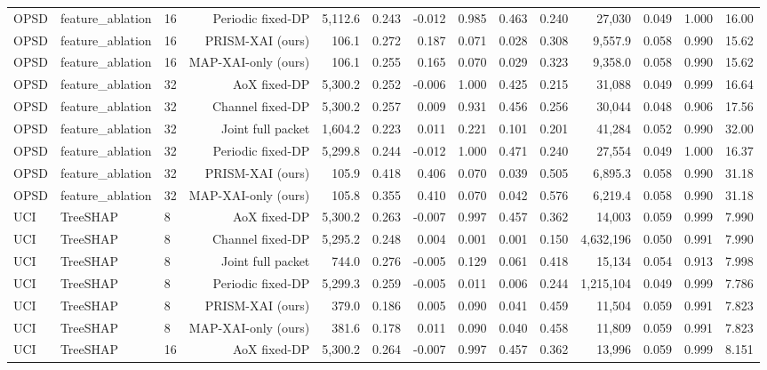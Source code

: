 \begin{longtable}{lllrrrrrrrrrrr}
OPSD & feature\_ablation & 16 & Periodic fixed-DP & 5,112.6 & 0.243 & -0.012 & 0.985 & 0.463 & 0.240 & 27,030 & 0.049 & 1.000 & 16.00 \\
OPSD & feature\_ablation & 16 & PRISM-XAI (ours) & 106.1 & 0.272 & 0.187 & 0.071 & 0.028 & 0.308 & 9,557.9 & 0.058 & 0.990 & 15.62 \\
OPSD & feature\_ablation & 16 & MAP-XAI-only (ours) & 106.1 & 0.255 & 0.165 & 0.070 & 0.029 & 0.323 & 9,358.0 & 0.058 & 0.990 & 15.62 \\
OPSD & feature\_ablation & 32 & AoX fixed-DP & 5,300.2 & 0.252 & -0.006 & 1.000 & 0.425 & 0.215 & 31,088 & 0.049 & 0.999 & 16.64 \\
OPSD & feature\_ablation & 32 & Channel fixed-DP & 5,300.2 & 0.257 & 0.009 & 0.931 & 0.456 & 0.256 & 30,044 & 0.048 & 0.906 & 17.56 \\
OPSD & feature\_ablation & 32 & Joint full packet & 1,604.2 & 0.223 & 0.011 & 0.221 & 0.101 & 0.201 & 41,284 & 0.052 & 0.990 & 32.00 \\
OPSD & feature\_ablation & 32 & Periodic fixed-DP & 5,299.8 & 0.244 & -0.012 & 1.000 & 0.471 & 0.240 & 27,554 & 0.049 & 1.000 & 16.37 \\
OPSD & feature\_ablation & 32 & PRISM-XAI (ours) & 105.9 & 0.418 & 0.406 & 0.070 & 0.039 & 0.505 & 6,895.3 & 0.058 & 0.990 & 31.18 \\
OPSD & feature\_ablation & 32 & MAP-XAI-only (ours) & 105.8 & 0.355 & 0.410 & 0.070 & 0.042 & 0.576 & 6,219.4 & 0.058 & 0.990 & 31.18 \\
UCI & TreeSHAP & 8 & AoX fixed-DP & 5,300.2 & 0.263 & -0.007 & 0.997 & 0.457 & 0.362 & 14,003 & 0.059 & 0.999 & 7.990 \\
UCI & TreeSHAP & 8 & Channel fixed-DP & 5,295.2 & 0.248 & 0.004 & 0.001 & 0.001 & 0.150 & 4,632,196 & 0.050 & 0.991 & 7.990 \\
UCI & TreeSHAP & 8 & Joint full packet & 744.0 & 0.276 & -0.005 & 0.129 & 0.061 & 0.418 & 15,134 & 0.054 & 0.913 & 7.998 \\
UCI & TreeSHAP & 8 & Periodic fixed-DP & 5,299.3 & 0.259 & -0.005 & 0.011 & 0.006 & 0.244 & 1,215,104 & 0.049 & 0.999 & 7.786 \\
UCI & TreeSHAP & 8 & PRISM-XAI (ours) & 379.0 & 0.186 & 0.005 & 0.090 & 0.041 & 0.459 & 11,504 & 0.059 & 0.991 & 7.823 \\
UCI & TreeSHAP & 8 & MAP-XAI-only (ours) & 381.6 & 0.178 & 0.011 & 0.090 & 0.040 & 0.458 & 11,809 & 0.059 & 0.991 & 7.823 \\
UCI & TreeSHAP & 16 & AoX fixed-DP & 5,300.2 & 0.264 & -0.007 & 0.997 & 0.457 & 0.362 & 13,996 & 0.059 & 0.999 & 8.151 \\

\end{longtable}
